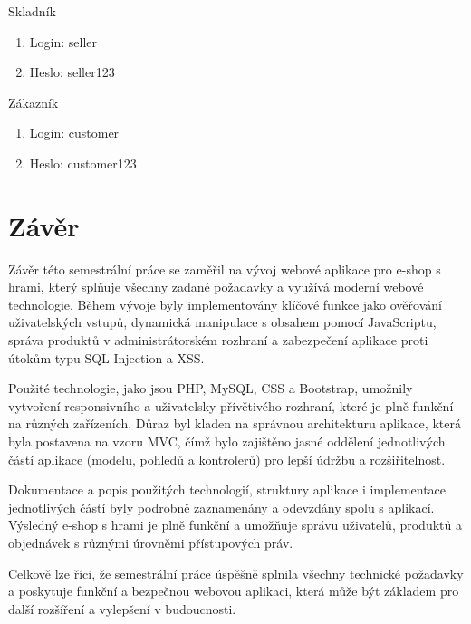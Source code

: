 \documentclass[12pt, a4paper]{report}
\begin{document}
Skladník
\begin{enumerate}[left=1cm]
    \item Login: seller
    \item Heslo: seller123
\end{enumerate}

Zákazník
\begin{enumerate}[left=1cm]
    \item Login: customer
    \item Heslo: customer123
\end{enumerate}

\section{Závěr}
Závěr této semestrální práce se zaměřil na vývoj webové aplikace pro e-shop s hrami, který splňuje všechny zadané požadavky a využívá moderní webové technologie. Během vývoje byly implementovány klíčové funkce jako ověřování uživatelských vstupů, dynamická manipulace s obsahem pomocí JavaScriptu, správa produktů v administrátorském rozhraní a zabezpečení aplikace proti útokům typu SQL Injection a XSS.

Použité technologie, jako jsou PHP, MySQL, CSS a Bootstrap, umožnily vytvoření responsivního a uživatelsky přívětivého rozhraní, které je plně funkční na různých zařízeních. Důraz byl kladen na správnou architekturu aplikace, která byla postavena na vzoru MVC, čímž bylo zajištěno jasné oddělení jednotlivých částí aplikace (modelu, pohledů a kontrolerů) pro lepší údržbu a rozšiřitelnost.

Dokumentace a popis použitých technologií, struktury aplikace i implementace jednotlivých částí byly podrobně zaznamenány a odevzdány spolu s aplikací. Výsledný e-shop s hrami je plně funkční a umožňuje správu uživatelů, produktů a objednávek s různými úrovněmi přístupových práv.

Celkově lze říci, že semestrální práce úspěšně splnila všechny technické požadavky a poskytuje funkční a bezpečnou webovou aplikaci, která může být základem pro další rozšíření a vylepšení v budoucnosti.
\end{document}
